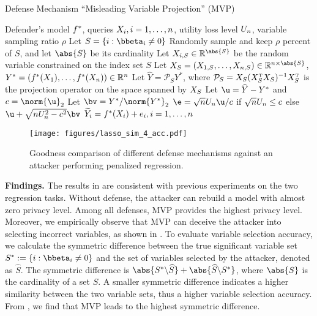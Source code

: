         \begin{algorithm}[tb]
        \caption{Defense Mechanism ``Misleading Variable Projection'' (MVP)}\label{alg:lasso}
        \begin{algorithmic}[1]
            \Require Defender's model $f^*$, queries $X_i, i=1, \ldots ,n$, utility loss level $U_n$, variable sampling ratio $\rho$
            \State Let $S=\{i: \bbeta_i \neq 0\}$ 
            \State Randomly sample and keep $\rho$ percent of $S$, and let $\abs{S}$ be its cardinality
            \State Let $\X_{i,S} \in \Real^{\abs{S}}$ be the random variable constrained on the index set $S$
            \State Let $\X_{S} = (\X_{1,S}, \dots, \X_{n,S}) \in \Real^{n\times \abs{S}}$, $Y^*=( f^*(X_1), \dots, f^*(X_n)) \in \mathbb{R}^n$
            \State Let $\hat{Y} = \mathcal{P}_S Y^*$, where $\mathcal{P}_S = X_{S} (X_{S}^{ \mathrm{\scriptscriptstyle T} } X_{S})^{-1} X_{S}^{ \mathrm{\scriptscriptstyle T} } $ is the projection operator on the space spanned by $X_{S}$
            \State Let $\u = \hat{Y} - Y^*$ and $c = \norm{\u}_2$ 
            \State Let $\bv = Y^*/\norm{Y^*}_2$ 
            \State $\e =  \sqrt{n} \Ul_n\u/c $ if $ \sqrt{n} U_n \leq c$ else $\u + \sqrt{n\Ul_n^2 - c^2} \bv$ 
            \Ensure $\widetilde{Y}_i = f^*(X_i) + e_i, i=1, \ldots ,n$
        \end{algorithmic}
        \end{algorithm}  
        
    \begin{figure}[tb]
        \centering
        \texttt{[image: figures/lasso\_sim\_4\_acc.pdf]}
        \caption{Goodness comparison of different defense mechanisms against an attacker performing penalized regression. }
        \label{fig:compare_defense_lasso}
    \end{figure}        



        
    \textbf{Findings.}
    The results in  are consistent with previous experiments on the two regression tasks. Without defense, the attacker can rebuild a model with almost zero privacy level. Among all defenses, MVP provides the highest privacy level. Moreover, we empirically observe that MVP can deceive the attacker into selecting incorrect variables, as shown in . To evaluate variable selection accuracy, we calculate the symmetric difference between the true significant variable set $S^*\defeq \{i: \bbeta_i \neq 0\}$ and the set of variables selected by the attacker, denoted as $\hat{S}$. The symmetric difference is $\abs{S^*\backslash \hat{S}}+ \abs{\hat{S} \backslash S^*}$, where $\abs{S}$ is the cardinality of a set $S$. A smaller symmetric difference indicates a higher similarity between the two variable sets, thus a higher variable selection accuracy. From , we find that MVP leads to the highest symmetric difference.

